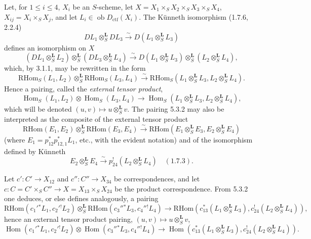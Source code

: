 \documentclass[11pt]{article}
\DeclareMathOperator{\Hom}{Hom}
\providecommand{\RHom}{\mathrm{RHom}}
\providecommand{\RHom}{\mathrm{RHom}}
\providecommand{\Hom}{\operatorname{Hom}}
\providecommand{\RHom}{\mathrm R\mathcal{H}om}
\providecommand{\RHom}{\mathrm{RHom}}
\begin{document}
Let, for $1\leq i\leq 4$, $X_i$ be an $S$-scheme, let $X=X_1\times_SX_2\times_SX_3\times_SX_4$, $X_{ij}=X_i\times_SX_j$, and let $L_i\in\operatorname{ob}D_{\mathrm{ctf}}(X_i)$. The Künneth isomorphism (1.7.6, 2.2.4)
\[
DL_1\otimes_S^{\mathbf L}DL_3\xrightarrow{\sim}D(L_1\otimes_S^{\mathbf L}L_3)
\]
defines an isomorphism on $X$
\begin{equation}
\tag{5.3.1}
(DL_1\otimes_S^{\mathbf L}L_2)\otimes_S^{\mathbf L}(DL_3\otimes_S^{\mathbf L}L_4)
\xrightarrow{\sim}D(L_1\otimes_S^{\mathbf L}L_3)\otimes_S^{\mathbf L}(L_2\otimes_S^{\mathbf L}L_4),
\end{equation}
which, by 3.1.1, may be rewritten in the form
\begin{equation}
\tag{5.3.2}
\RHom_S(L_1,L_2)\otimes_S^{\mathbf L}\RHom_S(L_3,L_4)
\xrightarrow{\sim}\RHom_S(L_1\otimes_S^{\mathbf L}L_3,L_2\otimes_S^{\mathbf L}L_4).
\end{equation}
Hence a pairing, called the \emph{external tensor product},
\begin{equation}
\tag{5.3.3}
\Hom_S(L_1,L_2)\otimes\Hom_S(L_3,L_4)
\longrightarrow\Hom_S(L_1\otimes_S^{\mathbf L}L_3,L_2\otimes_S^{\mathbf L}L_4),
\end{equation}
which will be denoted $(u,v)\mapsto u\otimes_S^{\mathbf L}v$. The pairing 5.3.2 may also be interpreted as the composite of the external tensor product
\[
\RHom(E_1,E_2)\otimes_S^{\mathbf L}\RHom(E_3,E_4)
\xrightarrow{\sim}\RHom(E_1\otimes_S^{\mathbf L}E_3,E_2\otimes_S^{\mathbf L}E_4)
\]
(where $E_1=p_{12}^*p_{12,1}^*L_1$, etc., with the evident notation) and of the isomorphism defined by Künneth
\[
E_2\otimes_S^{\mathbf L}E_4\xrightarrow{\sim}p_{24}^!(L_2\otimes_S^{\mathbf L}L_4)\quad (1.7.3).
\]

Let $c':C'\to X_{12}$ and $c'':C''\to X_{34}$ be correspondences, and let $c:C=C'\times_SC''\to X=X_{13}\times_SX_{24}$ be the product correspondence. From 5.3.2 one deduces, or else defines analogously, a pairing
\begin{equation}
\tag{5.3.4}
\RHom(c_1'{}^*L_1,c_2'{}^!L_2)\otimes_S^{\mathbf L}\RHom(c_3''{}^*L_3,c_4''{}^!L_4)
\longrightarrow\RHom(c_{13}^*(L_1\otimes_S^{\mathbf L}L_3),c_{24}^!(L_2\otimes_S^{\mathbf L}L_4)),
\end{equation}
hence an external tensor product pairing, $(u,v)\mapsto u\otimes_S^{\mathbf L}v$,
\begin{equation}
\tag{5.3.5}
\Hom(c_1'{}^*L_1,c_2'{}^!L_2)\otimes\Hom(c_3''{}^*L_3,c_4''{}^!L_4)
\longrightarrow\Hom(c_{13}^*(L_1\otimes_S^{\mathbf L}L_3),c_{24}^!(L_2\otimes_S^{\mathbf L}L_4)).
\end{equation}
\end{document}
